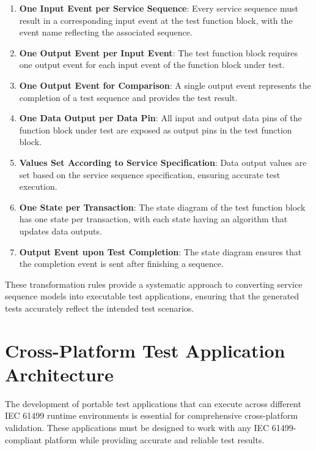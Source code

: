 \begin{enumerate}
    \item \textbf{One Input Event per Service Sequence}: Every service sequence must result in a corresponding input event at the test function block, with the event name reflecting the associated sequence.
    
    \item \textbf{One Output Event per Input Event}: The test function block requires one output event for each input event of the function block under test.
    
    \item \textbf{One Output Event for Comparison}: A single output event represents the completion of a test sequence and provides the test result.
    
    \item \textbf{One Data Output per Data Pin}: All input and output data pins of the function block under test are exposed as output pins in the test function block.
    
    \item \textbf{Values Set According to Service Specification}: Data output values are set based on the service sequence specification, ensuring accurate test execution.
    
    \item \textbf{One State per Transaction}: The state diagram of the test function block has one state per transaction, with each state having an algorithm that updates data outputs.
    
    \item \textbf{Output Event upon Test Completion}: The state diagram ensures that the completion event is sent after finishing a sequence.
\end{enumerate}

These transformation rules provide a systematic approach to converting service sequence models into executable test applications, ensuring that the generated tests accurately reflect the intended test scenarios.

\section{Cross-Platform Test Application Architecture}

The development of portable test applications that can execute across different IEC 61499 runtime environments is essential for comprehensive cross-platform validation. These applications must be designed to work with any IEC 61499-compliant platform while providing accurate and reliable test results.

